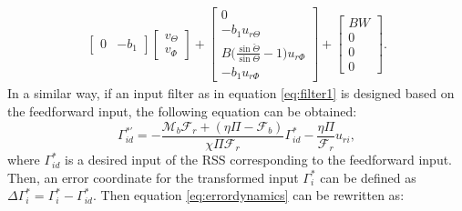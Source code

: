 \documentclass[../main.tex]{subfiles}
\begin{document}
\begin{align}
\begin{bmatrix}
		 0 & -b_1 
		 \end{bmatrix}
		\begin{bmatrix}
		v_\Theta \\
		v_\Phi
		\end{bmatrix} + 
		\begin{bmatrix}
		0 \\
		-b_1 u_{r\Theta} \\
		B\bigg( \frac{\sin \check{\Theta}}{\sin \Theta} - 1 \bigg) u_{r\Phi} \\
		-b_1 u_{r\Phi}
		\end{bmatrix}+
		\begin{bmatrix}
		BW \\
		0 \\
		0 \\
		0
		\end{bmatrix}.
		\label{eq:errordynamics}
	\end{align}
	In a similar way, if an input filter as in equation \eqref{eq:filter1} is designed based on the feedforward input, the following equation can be obtained:
	\begin{equation}
			\Gamma_{id}^{*'} = -\frac{\mathcal{M}_b \mathcal{F}_r + (\eta \Pi - \mathcal{F}_b)}{\chi \Pi \mathcal{F}_r}\Gamma_{id}^{*} - \frac{\eta \Pi}{\mathcal{F}_r}u_{ri}, \label{eq:filter2} 	
	\end{equation}
	where $\Gamma_{id}^*$ is a desired input of the RSS corresponding to the feedforward input. Then, an error coordinate for the transformed input $\Gamma_i^*$ can be defined as $\Delta \Gamma^*_{i} = \Gamma_i^* - \Gamma_{id}^*$. Then equation \eqref{eq:errordynamics} can be rewritten as:
\end{document}
